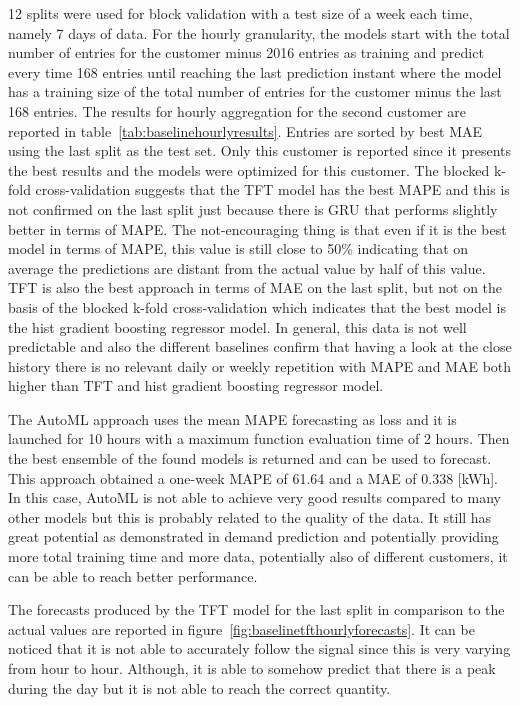 12 splits were used for block validation with a test size of a week each time, namely 7 days of data.
For the hourly granularity, the models start with the total number of entries for the customer minus 2016 entries as training and predict every time 168 entries until reaching the last prediction instant where the model has a training size of the total number of entries for the customer minus the last 168 entries.
The results for hourly aggregation for the second customer are reported in table~\ref{tab:baselinehourlyresults}.
Entries are sorted by best MAE using the last split as the test set.
Only this customer is reported since it presents the best results and the models were optimized for this customer.
The blocked k-fold cross-validation suggests that the TFT model has the best MAPE and this is not confirmed on the last split just because there is GRU that performs slightly better in terms of MAPE.
The not-encouraging thing is that even if it is the best model in terms of MAPE, this value is still close to 50\% indicating that on average the predictions are distant from the actual value by half of this value.
TFT is also the best approach in terms of MAE on the last split, but not on the basis of the blocked k-fold cross-validation which indicates that the best model is the hist gradient boosting regressor model.
In general, this data is not well predictable and also the different baselines confirm that having a look at the close history there is no relevant daily or weekly repetition with MAPE and MAE both higher than TFT and hist gradient boosting regressor model.

The AutoML approach uses the mean MAPE forecasting as loss and it is launched for 10 hours with a maximum function evaluation time of 2 hours.
Then the best ensemble of the found models is returned and can be used to forecast.
This approach obtained a one-week MAPE of 61.64 and a MAE of 0.338 [kWh].
In this case, AutoML is not able to achieve very good results compared to many other models but this is probably related to the quality of the data.
It still has great potential as demonstrated in demand prediction and potentially providing more total training time and more data, potentially also of different customers, it can be able to reach better performance.

The forecasts produced by the TFT model for the last split in comparison to the actual values are reported in figure~\ref{fig:baselinetfthourlyforecasts}.
It can be noticed that it is not able to accurately follow the signal since this is very varying from hour to hour.
Although, it is able to somehow predict that there is a peak during the day but it is not able to reach the correct quantity.

